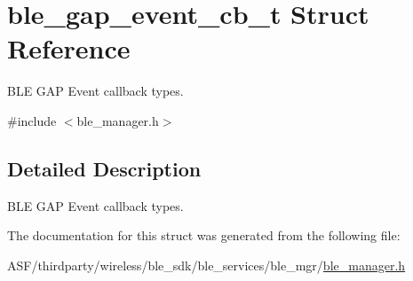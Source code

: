 \hypertarget{structble__gap__event__cb__t}{}\section{ble\+\_\+gap\+\_\+event\+\_\+cb\+\_\+t Struct Reference}
\label{structble__gap__event__cb__t}


B\+LE G\+AP Event callback types.  




{\ttfamily \#include $<$ble\+\_\+manager.\+h$>$}



\subsection{Detailed Description}
B\+LE G\+AP Event callback types. 

The documentation for this struct was generated from the following file\+:\begin{DoxyCompactItemize}
\item 
A\+S\+F/thirdparty/wireless/ble\+\_\+sdk/ble\+\_\+services/ble\+\_\+mgr/\mbox{\hyperlink{ble__manager_8h}{ble\+\_\+manager.\+h}}\end{DoxyCompactItemize}
